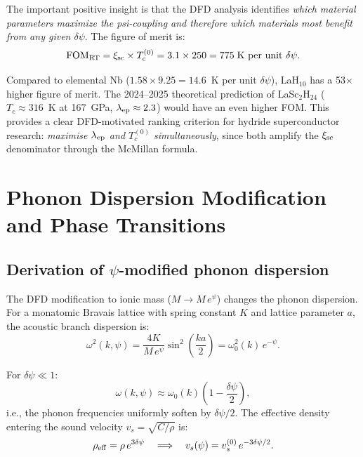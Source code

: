 \documentclass[11pt]{article}
\newcommand{\Tc}{T_{\rm c}}
\begin{document}
The important positive insight is that the DFD analysis identifies
\emph{which material parameters maximize the psi-coupling and therefore
which materials most benefit from any given $\delta\psi$}. The
figure of merit is:
\begin{equation}
\text{FOM}_{\rm RT} = \xi_{\rm sc} \times \Tc^{(0)}
= 3.1 \times 250 = 775\;\text{K per unit }\delta\psi.
\label{eq:FOM}
\end{equation}

Compared to elemental Nb ($1.58 \times 9.25 = 14.6$~K per unit $\delta\psi$),
LaH$_{10}$ has a 53$\times$ higher figure of merit. The 2024--2025
theoretical prediction of LaSc$_2$H$_{24}$ ($T_c \approx 316$~K at 167~GPa,
$\lambda_{\rm ep} \approx 2.3$) would have an even higher FOM. This provides
a clear DFD-motivated ranking criterion for hydride superconductor research:
\emph{maximise $\lambda_{\rm ep}$ and $T_c^{(0)}$ simultaneously}, since both
amplify the $\xi_{\rm sc}$ denominator through the McMillan formula.

\section{Phonon Dispersion Modification and Phase Transitions}
\label{sec:phonons}

\subsection{Derivation of $\psi$-modified phonon dispersion}

The DFD modification to ionic mass ($M \to M\,e^\psi$) changes the phonon
dispersion. For a monatomic Bravais lattice with spring constant $K$ and
lattice parameter $a$, the acoustic branch dispersion is:
\begin{equation}
\omega^2(k,\psi) = \frac{4K}{M\,e^\psi}\sin^2\!\left(\frac{ka}{2}\right)
= \omega_0^2(k)\,e^{-\psi}.
\label{eq:phonon-disp-1}
\end{equation}

For $\delta\psi \ll 1$:
\begin{equation}
\omega(k,\psi) \approx \omega_0(k)\left(1 - \frac{\delta\psi}{2}\right),
\label{eq:phonon-shift}
\end{equation}
i.e., the phonon frequencies uniformly soften by $\delta\psi/2$. The
effective density entering the sound velocity $v_s = \sqrt{C/\rho}$
is:
\begin{equation}
\rho_{\rm eff} = \rho\,e^{3\delta\psi}
\quad\Longrightarrow\quad
v_s(\psi) = v_s^{(0)}\,e^{-3\delta\psi/2}.
\label{eq:vs-psi}
\end{equation}
\end{document}
